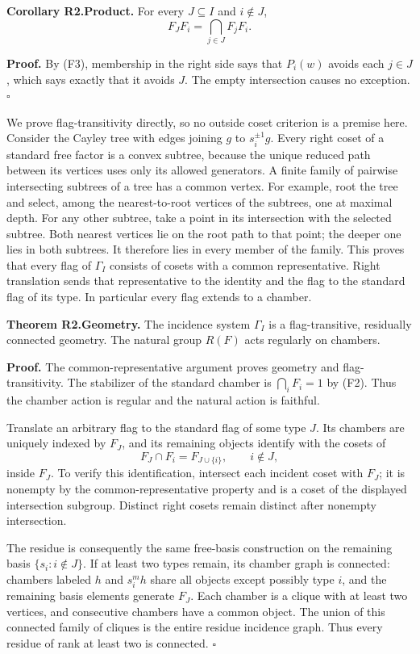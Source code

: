 \textbf{Corollary R2.Product.} For every \(J\subseteq I\) and
\(i\notin J\), \[
F_JF_i=\bigcap_{j\in J}F_jF_i.
\tag{F4}
\]

\textbf{Proof.} By (F3), membership in the right side says that
\(P_i(w)\) avoids each \(j\in J\), which says exactly that it avoids
\(J\). The empty intersection causes no exception. \(\square\)

We prove flag-transitivity directly, so no outside coset criterion is a
premise here. Consider the Cayley tree with edges joining \(g\) to
\(s_i^{\pm1}g\). Every right coset of a standard free factor is a convex
subtree, because the unique reduced path between its vertices uses only
its allowed generators. A finite family of pairwise intersecting
subtrees of a tree has a common vertex. For example, root the tree and
select, among the nearest-to-root vertices of the subtrees, one at
maximal depth. For any other subtree, take a point in its intersection
with the selected subtree. Both nearest vertices lie on the root path to
that point; the deeper one lies in both subtrees. It therefore lies in
every member of the family. This proves that every flag of \(\Gamma_I\)
consists of cosets with a common representative. Right translation sends
that representative to the identity and the flag to the standard flag of
its type. In particular every flag extends to a chamber.

\textbf{Theorem R2.Geometry.} The incidence system \(\Gamma_I\) is a
flag-transitive, residually connected geometry. The natural group
\(R(F)\) acts regularly on chambers.

\textbf{Proof.} The common-representative argument proves geometry and
flag-transitivity. The stabilizer of the standard chamber is
\(\bigcap_i F_i=1\) by (F2). Thus the chamber action is regular and the
natural action is faithful.

Translate an arbitrary flag to the standard flag of some type \(J\). Its
chambers are uniquely indexed by \(F_J\), and its remaining objects
identify with the cosets of \[
F_J\cap F_i=F_{J\cup\{i\}},\qquad i\notin J,
\] inside \(F_J\). To verify this identification, intersect each
incident coset with \(F_J\); it is nonempty by the common-representative
property and is a coset of the displayed intersection subgroup. Distinct
right cosets remain distinct after nonempty intersection.

The residue is consequently the same free-basis construction on the
remaining basis \(\{s_i:i\notin J\}\). If at least two types remain, its
chamber graph is connected: chambers labeled \(h\) and \(s_i^m h\) share
all objects except possibly type \(i\), and the remaining basis elements
generate \(F_J\). Each chamber is a clique with at least two vertices,
and consecutive chambers have a common object. The union of this
connected family of cliques is the entire residue incidence graph. Thus
every residue of rank at least two is connected. \(\square\)

